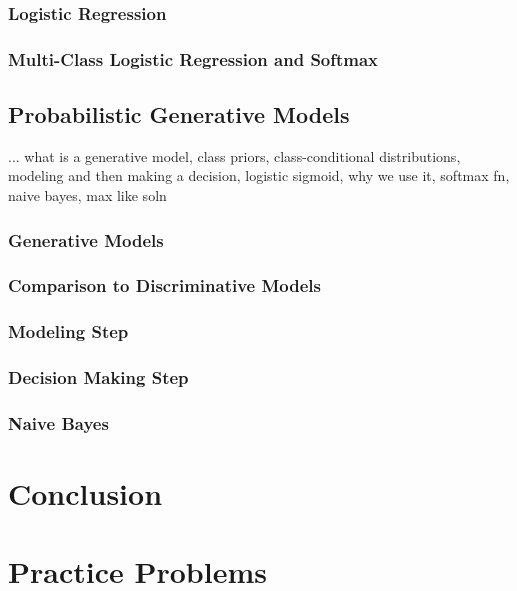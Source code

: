 \subsubsection{Logistic Regression}
\subsubsection{Multi-Class Logistic Regression and Softmax}

\subsection{Probabilistic Generative Models}
... what is a generative model, class priors, class-conditional distributions, modeling and then making a decision, logistic sigmoid, why we use it, softmax fn, naive bayes, max like soln

\subsubsection{Generative Models}
\subsubsection{Comparison to Discriminative Models}
\subsubsection{Modeling Step}
\subsubsection{Decision Making Step}
\subsubsection{Naive Bayes}

\section{Conclusion}
\section{Practice Problems}